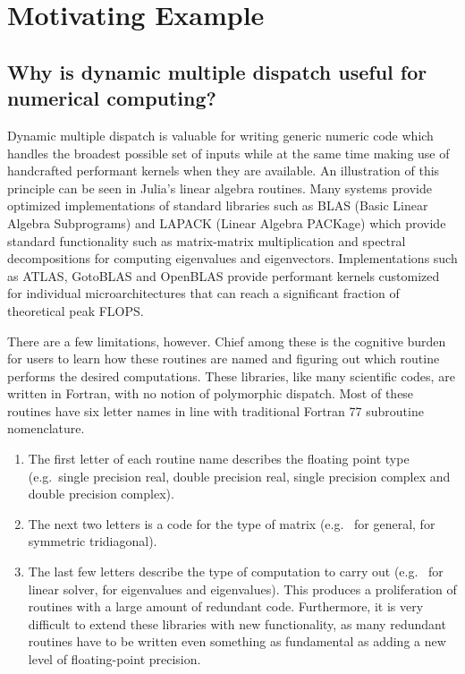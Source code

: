 \section{Motivating Example}

\subsection{Why is dynamic multiple dispatch useful for numerical computing?}

Dynamic multiple dispatch is valuable for writing generic numeric code which
handles the broadest possible set of inputs while at the same time making use
of handcrafted performant kernels when they are available. An illustration of
this principle can be seen in Julia's linear algebra routines. Many systems
provide optimized implementations of standard libraries such as BLAS (Basic
Linear Algebra Subprograms) and LAPACK (Linear Algebra PACKage) which provide
standard functionality such as matrix-matrix multiplication and spectral
decompositions for computing eigenvalues and eigenvectors. Implementations such
as ATLAS, GotoBLAS and OpenBLAS provide performant kernels customized for
individual microarchitectures that can reach a significant fraction of
theoretical peak FLOPS.

There are a few limitations, however. Chief among these is the cognitive burden
for users to learn how these routines are named and figuring out which routine
performs the desired computations. These libraries, like many scientific codes,
are written in Fortran, with no notion of polymorphic dispatch. Most of these
routines have six letter names in line with traditional Fortran 77 subroutine
nomenclature.

\begin{enumerate}

\item The first letter of each routine name describes the floating point type
(e.g.\ single precision real, double precision real, single precision complex
and double precision complex).

\item The next two letters is a code for the type of matrix (e.g.\  for
general,  for symmetric tridiagonal).

\item The last few letters describe the type of computation to carry out (e.g.\
 for linear solver,  for eigenvalues and eigenvalues). This
produces a proliferation of routines with a large amount of redundant code.
Furthermore, it is very difficult to extend these libraries with new
functionality, as many redundant routines have to be written even something as
fundamental as adding a new level of floating-point precision.

\end{enumerate}

